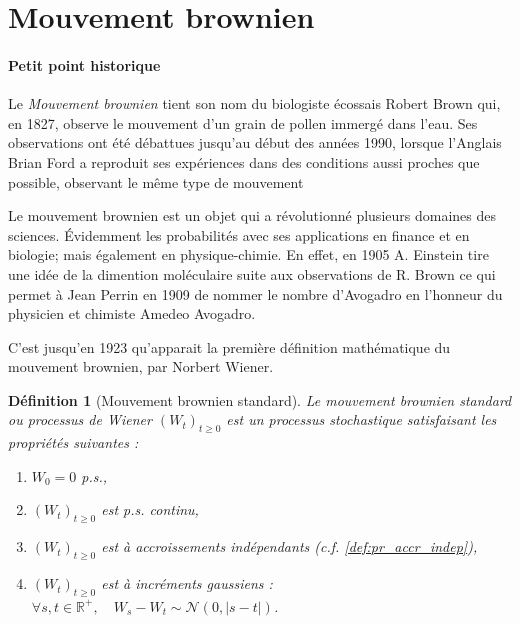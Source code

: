 \documentclass[openany]{book}
\newcommand{\R}{\mathbb{R}}
\newcommand{\1}{\mathbbm{1}}
\theoremstyle{thmfont}
\theoremstyle{deffont}
\newtheorem{definition}[definition]{Définition}
\theoremstyle{thmfont}
\theoremstyle{deffont}
\begin{document}
\section{Mouvement brownien}
\paragraph{Petit point historique}
Le \textit{Mouvement brownien} tient son nom du biologiste écossais Robert Brown qui, en 1827, observe le mouvement d'un grain de pollen immergé dans l'eau. Ses observations ont été débattues jusqu’au début des années 1990, lorsque l’Anglais Brian Ford a reproduit ses expériences dans des conditions aussi proches que possible, observant le même type de mouvement


Le mouvement brownien est un objet qui a révolutionné plusieurs domaines des sciences. Évidemment les probabilités avec ses applications en finance et en biologie; mais également en physique-chimie. En effet, en 1905 A. Einstein tire une idée de la dimention moléculaire suite aux observations de R. Brown ce qui permet à Jean Perrin en 1909 de nommer le nombre d'Avogadro en l'honneur du physicien et chimiste Amedeo Avogadro.


C'est jusqu'en 1923 qu'apparait la première définition mathématique du mouvement brownien, par Norbert Wiener.\\

\begin{definition}[Mouvement brownien standard]  \label{def:MvtBorwnien}
  Le \textit{mouvement brownien standard} ou \textit{processus de Wiener} $(W_t)_{t\geq0}$ est un processus stochastique satisfaisant les propriétés suivantes :
  \begin{enumerate}
  \item $W_0 = 0$ p.s.,
  \item $(W_t)_{t\geq0}$ est p.s. continu,
  \item $(W_t)_{t\geq0}$ est à accroissements indépendants (c.f. \autoref{def:pr_accr_indep}),
  \item $(W_t)_{t \geq 0}$ est à incréments gaussiens : $\forall s, t \in \R^+,\quad W_s - W_t \sim \mathcal{N}(0,|s-t|)$.
  \end{enumerate}
\end{definition}
\end{document}

